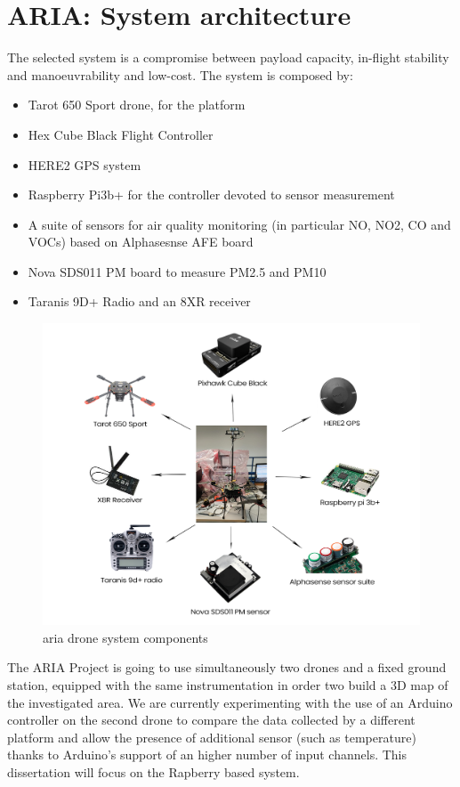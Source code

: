 \chapter{ARIA: System architecture}
The selected system is a compromise between payload capacity, in-flight stability and
manoeuvrability and low-cost. The system is composed by:
\begin{itemize}
    \item Tarot 650 Sport drone, for the platform
    \item Hex Cube Black Flight Controller
    \item HERE2 GPS system
    \item Raspberry Pi3b+ for the controller devoted to sensor measurement
    \item A suite of sensors for air quality monitoring (in particular NO, NO2, CO and VOCs) based on Alphasesnse AFE board
    \item Nova SDS011 PM board to measure PM2.5 and PM10
    \item Taranis 9D+ Radio and an 8XR receiver
\end{itemize}
\begin{figure}[h!]
    \centering
    \includegraphics[width=1\textwidth]{images/system-architecture.png}
    \caption{\gls{aria} drone system components}
    \label{fig:aria-drone}
\end{figure}
The ARIA Project is going to use
simultaneously two drones and a fixed ground station, equipped with the same instrumentation in
order two build a 3D map of the investigated area. We are currently experimenting with the use of an Arduino controller on the second drone to compare the data collected by a different platform and allow the presence of additional sensor (such as temperature) thanks to Arduino's support of an higher number of input channels. This dissertation will focus on the Rapberry based system.
